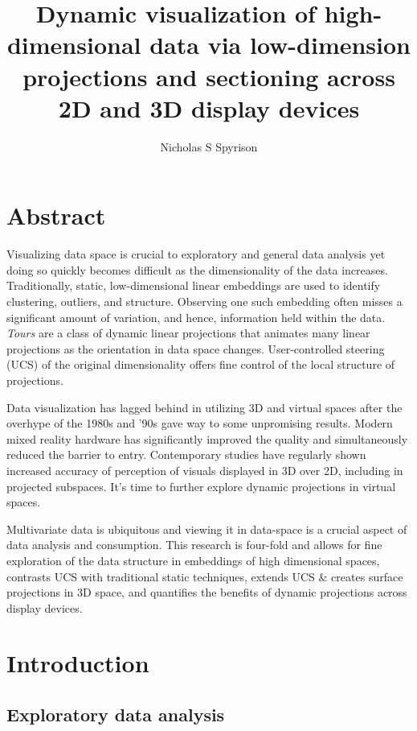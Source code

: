 \documentclass{monashthesis}
\author{Nicholas S Spyrison}
\title{Dynamic visualization of high-dimensional data via low-dimension projections and sectioning across 2D and 3D display devices}
\begin{document}

\titlepage

{\sf\tighttoc\doublespacing}

\hypertarget{abstract}{%
\chapter*{Abstract}\label{abstract}}

Visualizing data space is crucial to exploratory and general data analysis yet doing so quickly becomes difficult as the dimensionality of the data increases. Traditionally, static, low-dimensional linear embeddings are used to identify clustering, outliers, and structure. Observing one such embedding often misses a significant amount of variation, and hence, information held within the data. \emph{Tours} are a class of dynamic linear projections that animates many linear projections as the orientation in data space changes. User-controlled steering (UCS) of the original dimensionality offers fine control of the local structure of projections.

Data visualization has lagged behind in utilizing 3D and virtual spaces after the overhype of the 1980s and '90s gave way to some unpromising results. Modern mixed reality hardware has significantly improved the quality and simultaneously reduced the barrier to entry. Contemporary studies have regularly shown increased accuracy of perception of visuals displayed in 3D over 2D, including in projected subspaces. It's time to further explore dynamic projections in virtual spaces.

Multivariate data is ubiquitous and viewing it in data-space is a crucial aspect of data analysis and consumption. This research is four-fold and allows for fine exploration of the data structure in embeddings of high dimensional spaces, contrasts UCS with traditional static techniques, extends UCS \& creates surface projections in 3D space, and quantifies the benefits of dynamic projections across display devices.

\clearpage{}\setcounter{page}{0}

\hypertarget{ch:introduction}{%
\chapter{Introduction}\label{ch:introduction}}

\hypertarget{exploratory-data-analysis}{%
\section{Exploratory data analysis}\label{exploratory-data-analysis}}
\end{document}
